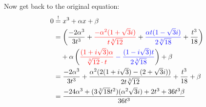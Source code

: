 Now get back to the original equation:
\begin{align}
    0 &\stackrel{!}{=} x^3 + \alpha x + \beta \\
       &= \left (\frac{-2 \alpha^3}{3 t^3}
        + \color{red}\frac{-\alpha^2(1+\sqrt{3}i)}{t\sqrt[3]{12}}\color{black}
        + \color{blue}\frac{\alpha t(1-\sqrt{3}i)}{2\sqrt[3]{18}}\color{black}
        + \frac{t^3}{18} \right )\\
    &\hphantom{{}=} + \alpha \left (\color{red}\frac{(1+i \sqrt{3})\alpha}{\sqrt[3]{12} \cdot t} \color{black}
     \color{blue}-\frac{(1-i\sqrt{3}) t}{2\sqrt[3]{18}} \color{black} \right ) + \beta\\
    &= \frac{-2 \alpha^3}{3 t^3}
    + \frac{\alpha^2(2(1+i\sqrt{3})-(2+\sqrt{3}i))}{2t\sqrt[3]{12}}
    + \frac{t^3}{18}
    + \beta\\
    &= \frac{-24 \alpha^3 + (3\sqrt[3]{18}t^2)(\alpha^2\sqrt{3}i) + 2t^3+36 t^3 \beta}{36t^3}
\end{align}

